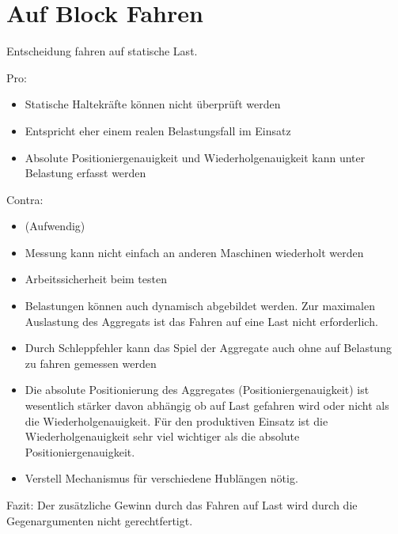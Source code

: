 \chapter{Auf Block Fahren}

Entscheidung fahren auf statische Last.

Pro:
\begin{itemize}
 \item Statische Haltekräfte können nicht überprüft werden
 \item Entspricht eher einem realen Belastungsfall im Einsatz
 \item Absolute Positioniergenauigkeit und Wiederholgenauigkeit kann unter Belastung erfasst werden
\end{itemize}


Contra:
\begin{itemize}
 \item (Aufwendig)
 \item Messung kann nicht einfach an anderen Maschinen wiederholt werden
  \item Arbeitssicherheit beim testen
  \item Belastungen können auch dynamisch abgebildet werden. Zur maximalen Auslastung des Aggregats ist das Fahren auf eine Last nicht erforderlich.
  \item Durch Schleppfehler kann das Spiel der Aggregate auch ohne auf Belastung zu fahren gemessen werden
  \item Die absolute Positionierung des Aggregates (Positioniergenauigkeit) ist wesentlich stärker davon abhängig ob auf Last gefahren wird oder nicht als die Wiederholgenauigkeit. Für den produktiven Einsatz ist die Wiederholgenauigkeit sehr viel wichtiger als die absolute Positioniergenauigkeit. 
  \item Verstell Mechanismus für verschiedene Hublängen nötig.
\end{itemize}

Fazit:
Der zusätzliche Gewinn durch das Fahren auf Last wird durch die Gegenargumenten nicht gerechtfertigt.

